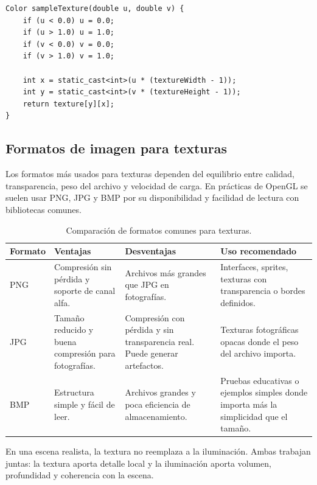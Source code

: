 \documentclass[a4paper,12pt]{article}
\begin{document}
\begin{lstlisting}
Color sampleTexture(double u, double v) {
    if (u < 0.0) u = 0.0;
    if (u > 1.0) u = 1.0;
    if (v < 0.0) v = 0.0;
    if (v > 1.0) v = 1.0;

    int x = static_cast<int>(u * (textureWidth - 1));
    int y = static_cast<int>(v * (textureHeight - 1));
    return texture[y][x];
}
\end{lstlisting}

\subsection{Formatos de imagen para texturas}

Los formatos más usados para texturas dependen del equilibrio entre calidad, transparencia, peso del archivo y velocidad de carga. En prácticas de OpenGL se suelen usar PNG, JPG y BMP por su disponibilidad y facilidad de lectura con bibliotecas comunes.

\begin{table}[H]
\centering
\begin{tabular}{|p{}|p{}|p{}|p{}|}
\hline
\textbf{Formato} & \textbf{Ventajas} & \textbf{Desventajas} & \textbf{Uso recomendado} \\
\hline
PNG & Compresión sin pérdida y soporte de canal alfa. & Archivos más grandes que JPG en fotografías. & Interfaces, sprites, texturas con transparencia o bordes definidos. \\
\hline
JPG & Tamaño reducido y buena compresión para fotografías. & Compresión con pérdida y sin transparencia real. Puede generar artefactos. & Texturas fotográficas opacas donde el peso del archivo importa. \\
\hline
BMP & Estructura simple y fácil de leer. & Archivos grandes y poca eficiencia de almacenamiento. & Pruebas educativas o ejemplos simples donde importa más la simplicidad que el tamaño. \\
\hline
\end{tabular}
\caption{Comparación de formatos comunes para texturas.}
\end{table}

En una escena realista, la textura no reemplaza a la iluminación. Ambas trabajan juntas: la textura aporta detalle local y la iluminación aporta volumen, profundidad y coherencia con la escena.
\end{document}
